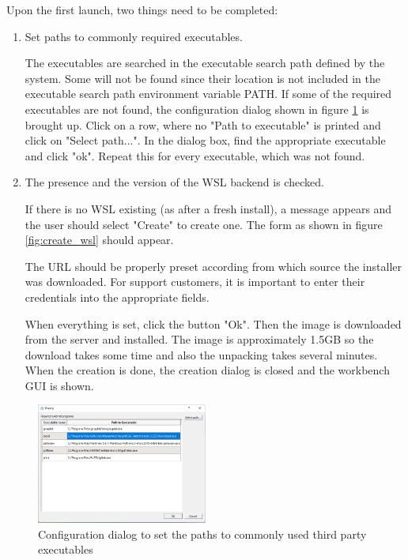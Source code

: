 Upon the first launch, two things need to be completed:
\begin{enumerate}
\item Set paths to commonly required executables.

The executables are searched in the executable search path defined by the system. 
Some will not be found since their location is not included in the executable search path environment variable PATH.
If some of the required executables are not found, the configuration dialog shown in figure \ref{fig:set_paths} is brought up.
Click on a row, where no "Path to executable" is printed and click on "Select path...". 
In the dialog box, find the appropriate executable and click "ok".
Repeat this for every executable, which was not found.

\item The presence and the version of the WSL backend is checked.

If there is no WSL existing (as after a fresh install), a message appears and the user should select "Create" to create one.
The form as shown in figure \ref{fig:create_wsl} should appear.

The URL should be properly preset according from which source the installer was downloaded.
For support customers, it is important to enter their credentials into the appropriate fields.

When everything is set, click the button "Ok".
Then the image is downloaded from the server and installed.
The image is approximately 1.5GB so the download takes some time and also the unpacking takes several minutes.
When the creation is done, the creation dialog is closed and the workbench GUI is shown.

\end{enumerate}

\begin{figure}[ht]
\centering
\includegraphics[width=0.5\textwidth]{figs/workbench/set_paths}
\caption{Configuration dialog to set the paths to commonly used third party executables}
\label{fig:set_paths}
\end{figure}

